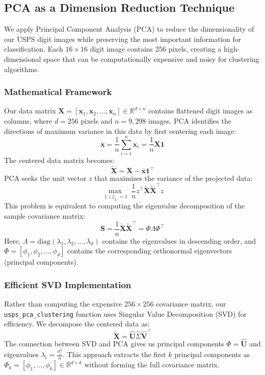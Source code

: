 \documentclass{article}
\begin{document}
\subsection{PCA as a Dimension Reduction Technique}
We apply Principal Component Analysis (PCA) to reduce the dimensionality of our USPS digit images while preserving the most important information for classification. Each $16 \times 16$ digit image contains 256 pixels, creating a high-dimensional space that can be computationally expensive and noisy for clustering algorithms.
\subsubsection{Mathematical Framework}
Our data matrix $\mathbf{X} = [\mathbf{x}_1, \mathbf{x}_2, \ldots, \mathbf{x}_n] \in \mathbb{R}^{d \times n}$ contains flattened digit images as columns, where $d = 256$ pixels and $n = 9{,}298$ images. PCA identifies the directions of maximum variance in this data by first centering each image:
\[
\bar{\mathbf{x}} = \frac{1}{n} \sum_{i=1}^n \mathbf{x}_i = \frac{1}{n} \mathbf{X} \mathbf{1}
\]
The centered data matrix becomes:
\[
\tilde{\mathbf{X}} = \mathbf{X} - \bar{\mathbf{x}} \mathbf{1}^\top
\]
PCA seeks the unit vector $z$ that maximizes the variance of the projected data:
\[
\max_{\| z \|_2 = 1} \ \frac{1}{n} z^\top \tilde{\mathbf{X}} \tilde{\mathbf{X}}^\top z
\]
This problem is equivalent to computing the eigenvalue decomposition of the sample covariance matrix:
\[
\mathbf{S} = \frac{1}{n} \tilde{\mathbf{X}} \tilde{\mathbf{X}}^\top = \Phi \Lambda \Phi^\top
\]
Here, $\Lambda = \text{diag}(\lambda_1, \lambda_2, \ldots, \lambda_d)$ contains the eigenvalues in descending order, and $\Phi = [\phi_1, \phi_2, \ldots, \phi_d]$ contains the corresponding orthonormal eigenvectors (principal components).

\subsubsection{Efficient SVD Implementation}
Rather than computing the expensive $256 \times 256$ covariance matrix, our \texttt{usps\_pca\_clustering} function uses Singular Value Decomposition (SVD) for efficiency. We decompose the centered data as:
\[
\tilde{\mathbf{X}} = \hat{\mathbf{U}} \hat{\Sigma} \hat{\mathbf{V}}^\top
\]
The connection between SVD and PCA gives us principal components $\Phi = \hat{\mathbf{U}}$ and eigenvalues $\lambda_i = \frac{\sigma_i^2}{n}$. This approach extracts the first $k$ principal components as $\Phi_k = [\phi_1, \ldots, \phi_k] \in \mathbb{R}^{d \times k}$ without forming the full covariance matrix.
\end{document}
